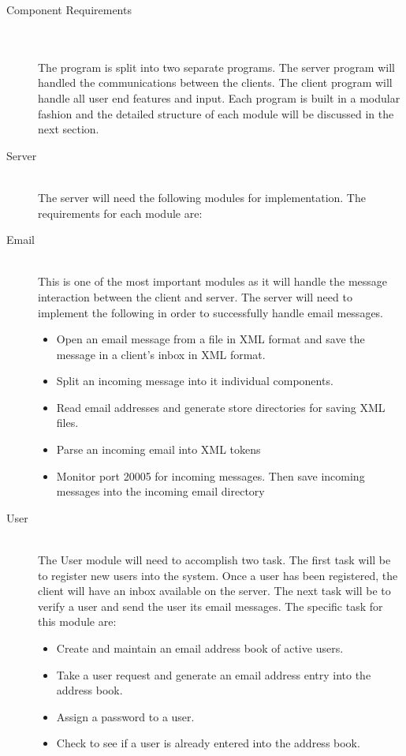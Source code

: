 \documentclass[11pt, letterpaper]{report}
\begin{document}
\begin{description}
\newpage
\item[\Large Component Requirements] \hfill \\ \hfill \\
The program is split into two separate programs. The server program will handled the communications between the clients. The client program will handle all user end features and input. Each program is built in a modular fashion and the detailed structure of each module will be discussed in the next section. 
\item[\large Server]\hfill \\
The server will need the following modules for implementation. The requirements for each module are: 
\item[Email]\hfill \\
This is one of the most important modules as it will handle the message interaction between the client and server. The server will need to implement the following in order to successfully handle email messages.
\begin{itemize}
\item Open an email message from a file in XML format and save the message in a client's inbox in XML format.
\item Split an incoming message into it individual components.
\item Read email addresses and generate store directories for saving XML files.
\item Parse an incoming email into XML tokens
\item Monitor port 20005 for incoming messages. Then save incoming messages into the incoming email directory
\end{itemize}
\item[User]\hfill \\
The User module will need to accomplish two task. The first task will be to register new users into the system. Once a user has been registered, the client will have an inbox available on the server. The next task will be to verify a user and send the user its email messages. The specific task for this module are:
\begin{itemize}
\item Create and maintain an email address book of active users.
\item Take a user request and generate an email address entry into the address book.
\item Assign a password to a user.
\item Check to see if a user is already entered into the address book.

\end{itemize}
\end{description}
\end{document}
